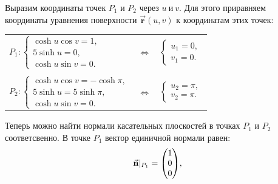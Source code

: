\documentclass[12pt,a4paper]{article}
\newcommand{\boldVec}[1]{\vec{\mathbf #1}}
\begin{document}
    Выразим координаты точек $ P_1 $ и $ P_2 $ через $ u \ \text{и} \ v $. Для этого приравняем координаты уравнения поверхности $ \boldVec r(u, v) $ к координатам этих точек:
    \begin{table}[h]
        \centering
        \begin{tabular}{lcl}
            $
                P_1 \colon
                \begin{cases}
                    \cosh u \cos v = 1,
                    \\
                    5 \sinh u = 0,
                    \\
                    \cosh u \sin v = 0.
                \end{cases} 
            $ 
            & $ \Leftrightarrow $ & 
            $
                \begin{cases}
                    u_1 = 0,
                    \\
                    v_1 = 0.
                \end{cases}
            $

            \\ \\

            $
                P_2 \colon
                \begin{cases}
                    \cosh u \cos v = -\cosh \pi,
                    \\
                    5 \sinh u =  5 \sinh \pi,
                    \\
                    \cosh u \sin v = 0.
                \end{cases}
            $ 
            & $ \Leftrightarrow $ & 
            $
                \begin{cases}
                    u_2 = \pi,
                    \\
                    v_2 = \pi.
                \end{cases}
            $

        \end{tabular}
    \end{table}

    Теперь можно найти нормали касательных плоскостей в точках $ P_1 $ и $ P_2 $ соответсвенно. В точке $ {P_1} $ вектор единичной нормали равен:
    \[
        \vec{\textbf n}|_{P_1} =
        \begin{pmatrix}
            1 
            \\ 
            0 
            \\ 
            0  
        \end{pmatrix}\! ,
    \]
\end{document}
